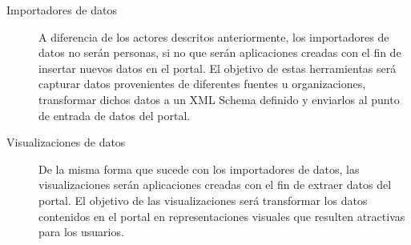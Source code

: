 \begin{description}
\item[Importadores de datos]  A diferencia de los actores descritos anteriormente, los importadores de datos no serán personas, si no que serán aplicaciones creadas con el fin de insertar nuevos datos en el portal.  El objetivo de estas herramientas será capturar datos provenientes de diferentes fuentes u organizaciones, transformar dichos datos a un XML Schema definido y enviarlos al punto de entrada de datos del portal.
\item[Visualizaciones de datos]  De la misma forma que sucede con los importadores de datos, las visualizaciones serán aplicaciones creadas con el fin de extraer datos del portal.  El objetivo de las visualizaciones será transformar los datos contenidos en el portal en representaciones visuales que resulten atractivas para los usuarios.
\end{description}


